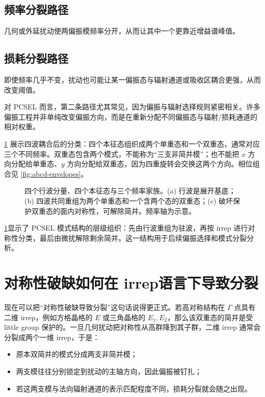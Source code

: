 \subsection{频率分裂路径}
几何或外延扰动使两偏振模频率分开，从而让其中一个更靠近增益谱峰值。

\subsection{损耗分裂路径}
即使频率几乎不变，扰动也可能让某一偏振态与辐射通道或吸收区耦合更强，从而改变阈值。

对 PCSEL 而言，第二条路径尤其常见，因为偏振与辐射选择规则紧密相关。许多偏振工程并非单纯改变偏振方向，而是在重新分配不同偏振态与辐射/损耗通道的相对权重。

\cref{fig:ch08_four_mode_triplet} 展示四波耦合后的分类：四个本征态组织成两个单重态和一个双重态，通常对应三个不同频率。双重态包含两个模式，不能称为“三支非简并模”；也不能把 $x$ 方向分配给单重态、$y$ 方向分配给双重态，因为四重旋转会交换这两个方向。相位组合见 \cref{fig:abcd-envelopes}。

\begin{figure}[htbp]
  \centering
  
  \caption{四个行波分量、四个本征态与三个频率家族。(a) 行波是展开基底；(b) 四波共同重组为两个单重态和一个含两个态的双重态；(c) 破坏保护双重态的面内对称性，可解除简并。频率轴为示意。}
  \label{fig:ch08_four_mode_triplet}
\end{figure}

\cref{fig:ch08_four_mode_triplet}显示了 PCSEL 模式结构的层级组织：先由行波重组为驻波，再按 irrep 进行对称性分类，最后由微扰解除剩余简并。这一结构用于后续偏振选择和模式分裂分析。

\section{对称性破缺如何在 irrep语言下导致分裂}
现在可以把“对称性破缺导致分裂”这句话说得更正式。若高对称结构在 $\Gamma$ 点具有二维 irrep，例如方格晶格的 $E$ 或三角晶格的 $E_1,E_2$，那么该双重态的简并是受 little group 保护的。一旦几何扰动把对称性从高群降到其子群，二维 irrep 通常会分裂成两个一维 irrep，于是：
\begin{itemize}
  \item 原本双简并的模式分成两支非简并模；
  \item 两支模往往分别锁定到扰动的主轴方向，因此偏振被钉扎；
  \item 若这两支模与法向辐射通道的表示匹配程度不同，损耗分裂就会随之出现。
\end{itemize}

